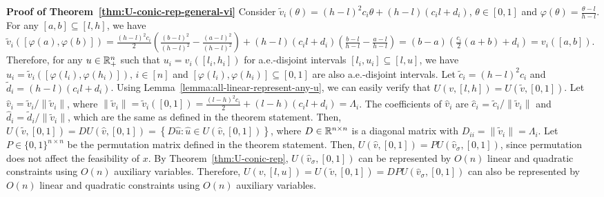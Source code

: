 	\smallskip\noindent\textbf{Proof of Theorem~\ref{thm:U-conic-rep-general-vi}}
Consider $\tilde{v}_i(\theta) = (h-l)^2 c_i \theta + (h-l)(c_i l + d_i)$, $\theta\in [0,1]$ and $\varphi(\theta) = \frac{\theta-l}{h-l}$. For any $[a,b]\subseteq [l,h]$, we have
$
	\tilde{v}_i([\varphi(a), \varphi(b)]) = \frac{(h-l)^2 c_i}{2}\left( \frac{(b-l)^2}{(h-l)^2} - \frac{(a-l)^2}{(h-l)^2} \right) + (h-l)(c_i l + d_i) \left( \frac{b-l}{h-l} - \frac{a-l}{h-l} \right) 
	= (b-a)\left( \frac{c_i}{2}(a+b) + d_i \right) = v_i([a,b])$.
Therefore, for any $u\in \mathbb{R}_+^n$ such that $u_i = v_i([l_i, h_i])$ for a.e.-disjoint intervals $[l_i, u_i]\subseteq [l,u]$, we have 
$u_i = \tilde{v}_i([\varphi(l_i), \varphi(h_i)]),\, i\in [n]$
and $[\varphi(l_i), \varphi(h_i) ]\subseteq [0,1]$ are also a.e.-disjoint intervals. Let $\tilde{c}_i = (h-l)^2 c_i$ and $\tilde{d}_i = (h-l)(c_i l + d_i)$. Using Lemma~\ref{lemma:all-linear-represent-any-u}, we can easily verify that
$U(v, [l,h]) = U(\tilde{v}, [0,1])$.
Let $\hat{v}_i = \tilde{v}_i/\|\tilde{v}_i\|$, where $\|\tilde{v}_i\| = \tilde{v}_i([0,1]) =\frac{(l-h)^2c_i}{2} + (l-h)(c_i l + d_i) = \Lambda_i$. 
The coefficients of $\hat{v}_i$ are $\hat{c}_i$ = $\tilde{c}_i / \|\tilde{v}_i\|$ and $\hat{d}_i = \tilde{d}_i / \|\tilde{v}_i \|$, which are the same as defined in the theorem statement. Then,
$U(\tilde{v}, [0,1]) = D U(\hat{v},[0,1]) = \left\{D\hat{u}: \hat{u} \in U(\hat{v}, [0,1]) \right\}$,
where $D \in \mathbb{R}^{n\times n}$ is a diagonal matrix with $D_{ii} = \|\tilde{v}_i\| = \Lambda_i$. 
Let $P\in \{0,1\}^{n\times n}$ be the permutation matrix defined in the theorem statement. Then, 
$U(\hat{v}, [0,1]) = PU(\hat{v}_\sigma, [0,1])$,
since permutation does not affect the feasibility of $x$. By Theorem~\ref{thm:U-conic-rep}, $U(\hat{v}_\sigma, [0,1])$ can be represented by $O(n)$ linear and quadratic constraints using $O(n)$ auxiliary variables.
Therefore, 
$U(v, [l,u]) = U(\tilde{v}, [0,1]) = D P U(\hat{v}_\sigma, [0,1])$
can also be represented by $O(n)$ linear and quadratic constraints using $O(n)$ auxiliary variables. 

